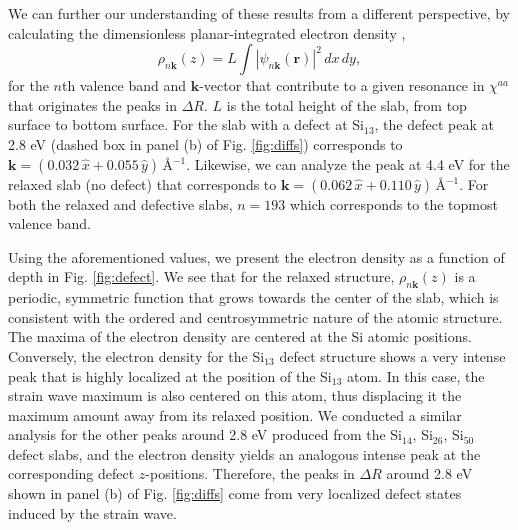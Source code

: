 \documentclass[aps,prb,10pt,showkeys,letterpaper,notitlepage,twocolumn]{revtex4-1}
\begin{document}
We can further our understanding of these results from a different perspective,
by calculating the dimensionless planar-integrated electron density
\cite{mendozaPRB06},
\begin{equation*}
\rho_{n\mathbf{k}}(z) = L \int |\psi_{n\mathbf{k}}(\mathbf{r})|^{2} \,dx\,dy,
\end{equation*}
for the $n$th valence band and $\mathbf{k}$-vector that contribute to a given
resonance in $\chi^{aa}$ that originates the peaks in $\Delta R$. $L$ is the
total height of the slab, from top surface to bottom surface. For the slab with
a defect at Si$_{13}$, the defect peak at 2.8 eV (dashed box in panel (b) of
Fig. \ref{fig:diffs}) corresponds to $\mathbf{k} = (0.032\,\hat{x} +
0.055\,\hat{y})$\,\r{A}$^{-1}$. Likewise, we can analyze the peak at 4.4 eV for
the relaxed slab (no defect) that corresponds to $\mathbf{k} = (0.062\,\hat{x} +
0.110\,\hat{y})$\,\r{A}$^{-1}$. For both the relaxed and defective slabs, $n =
193$ which corresponds to the topmost valence band.

Using the aforementioned values, we present the electron density as a function
of depth in Fig. \ref{fig:defect}. We see that for the relaxed structure,
$\rho_{n\mathbf{k}}(z)$ is a periodic, symmetric function that grows towards the
center of the slab, which is consistent with the ordered and centrosymmetric
nature of the atomic structure. The maxima of the electron density are centered
at the Si atomic positions. Conversely, the electron density for the Si$_{13}$
defect structure shows a very intense peak that is highly localized at the
position of the Si$_{13}$ atom. In this case, the strain wave maximum is also
centered on this atom, thus displacing it the maximum amount away from its
relaxed position. We conducted a similar analysis for the other peaks around 2.8
eV produced from the Si$_{14}$, Si$_{26}$, Si$_{50}$ defect slabs, and the
electron density yields an analogous intense peak at the corresponding defect
$z$-positions. Therefore, the peaks in $\Delta R$ around 2.8 eV shown in panel
(b) of Fig. \ref{fig:diffs} come from very localized defect states induced by
the strain wave.
\end{document}

